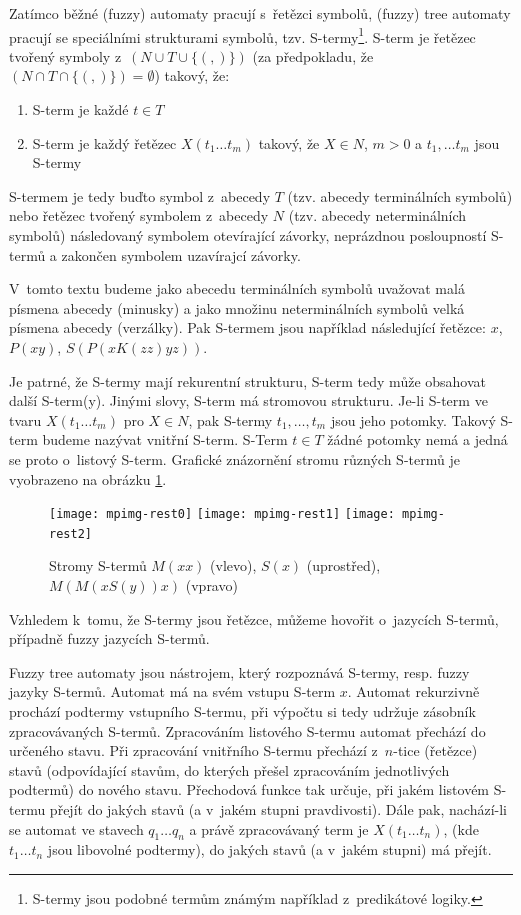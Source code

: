 Zatímco běžné (fuzzy) automaty pracují s~řetězci symbolů, (fuzzy) tree automaty pracují se speciálními strukturami symbolů, tzv. S-termy\footnote{S-termy jsou podobné termům známým například z~predikátové logiky.}. S-term je řetězec tvořený symboly z~$(N \cup T \cup \{ (, ) \})$ (za předpokladu, že $(N \cap T \cap \{ (, ) \}) = \emptyset$) takový, že:
\begin{enumerate}
 \item S-term je každé $ t \in T$
 \item S-term je každý řetězec $ X ( t_1 \dots t_m )$ takový, že $X \in N$, $m > 0$ a $t_1, \dots t_m$ jsou S-termy
\end{enumerate}
S-termem je tedy buďto symbol z~abecedy $T$ (tzv. abecedy terminálních symbolů) nebo řetězec tvořený symbolem z~abecedy $N$ (tzv. abecedy neterminálních symbolů) následovaný symbolem otevírající závorky, neprázdnou posloupností S-termů a zakončen symbolem uzavírajcí závorky.

V~tomto textu budeme jako abecedu terminálních symbolů uvažovat malá písmena abecedy (minusky) a jako množinu neterminálních symbolů velká písmena abecedy (verzálky). Pak S-termem jsou například následující řetězce: $x$, $P(x y)$, $S(P(x K(z z) y z))$.

Je patrné, že S-termy mají rekurentní strukturu, S-term tedy může obsahovat další S-term(y). Jinými slovy, S-term má stromovou strukturu. Je-li S-term ve tvaru $X(t_1 \dots t_m)$ pro $X \in N$, pak S-termy $t_1, \dots, t_m$ jsou jeho potomky. Takový S-term budeme nazývat vnitřní S-term. S-Term $t \in T$ žádné potomky nemá a jedná se proto o~listový S-term. Grafické znázornění stromu různých S-termů je vyobrazeno na obrázku \ref{img:Tree}.

\begin{figure}
  \centering
   \hfill
   \texttt{[image: mpimg-rest0]} 
   \hfill
   \texttt{[image: mpimg-rest1]}
   \hfill
   \texttt{[image: mpimg-rest2]}
   \hfill
 \caption[Stromy S-termů]{Stromy S-termů $M(xx)$ (vlevo), $S(x)$ (uprostřed), $M(M(x S(y)) x)$ (vpravo)} \label{img:Tree}
\end{figure}

Vzhledem k~tomu, že S-termy jsou řetězce, můžeme hovořit o~jazycích S-termů, případně fuzzy jazycích S-termů. 

Fuzzy tree automaty jsou nástrojem, který rozpoznává S-termy, resp. fuzzy jazyky S-termů. Automat má na svém vstupu S-term $x$. Automat rekurzivně prochází podtermy vstupního S-termu, při výpočtu si tedy udržuje zásobník zpracovávaných S-termů. Zpracováním listového S-termu automat přechází do určeného stavu. Při zpracování vnitřního S-termu přechází z~$n$-tice (řetězce) stavů (odpovídající stavům, do kterých přešel zpracováním jednotlivých podtermů) do nového stavu. Přechodová funkce tak určuje, při jakém listovém S-termu přejít do jakých stavů (a v~jakém stupni pravdivosti). Dále pak, nachází-li se automat ve stavech $q_1 \dots q_n$ a právě zpracovávaný term je $X(t_1 \dots t_n)$, (kde $t_1 \dots t_n$ jsou libovolné podtermy), do jakých stavů (a v~jakém stupni) má přejít.

